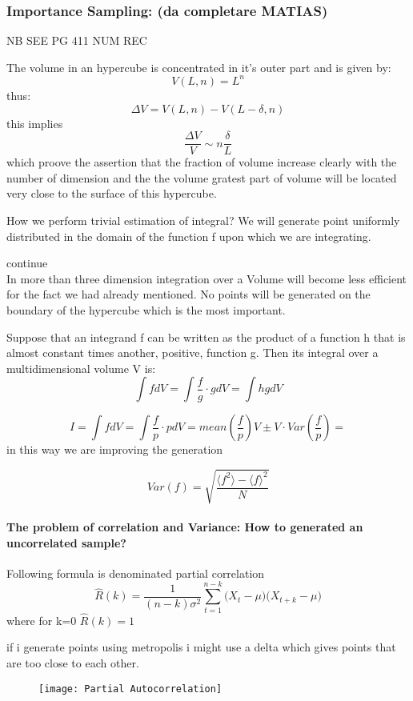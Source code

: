 \begin{figure}[h]
\centering
{}
\caption{}
\label{fig:Rejection method1}
\end{figure}

\subsubsection{Importance Sampling: (da completare MATIAS)}
NB SEE PG 411 NUM REC

The volume in an hypercube is concentrated in it's outer part and is given by:
\[ V(L,n)=L^{n}\]
thus:
\[\Delta V = V(L,n) - V(L-\delta,n)\]
this implies
\[ \frac{\Delta V}{V}\sim n\frac{\delta}{L}\]
which proove the assertion that the fraction of volume increase clearly with the number of dimension and the the volume gratest part of volume will be located very close to the surface of this hypercube.

How we perform trivial estimation of integral?
We will generate point uniformly distributed in the domain of the function f upon which we are integrating.

continue\\ 
In more than three dimension integration over a Volume will become less efficient for the fact we had already mentioned. No points will be generated on the boundary of the hypercube which is the most important.

Suppose that an integrand f can be written as the product of a function h that is almost constant times another, positive, function g. Then its integral over a multidimensional volume V is:
\[\int fdV=\int\frac{f}{g}\cdot gdV = \int hgdV\]

\[I=\int f dV= \int \frac{f}{p} \cdot p dV= mean(\frac{f}{p})V \pm V\cdot Var(\frac{f}{p}) = \]
in this way we are improving the generation 

\[Var(f)= \sqrt{\frac{\langle f^2 \rangle- \langle f  \rangle^2}{N}}\]

\paragraph{The problem of correlation and Variance: How to generated an uncorrelated sample?}


Following formula is denominated partial correlation
\[\hat{R}(k)=\frac{1}{(n-k)\sigma^2}\sum^{n-k}_{t=1}\Big(X_{t}-\mu\Big)\Big(X_{t+k}-\mu\Big) \]
where for k=0 $\hat{R}(k)=1$

if i generate points using metropolis i might use a delta which gives points that are too close to each other.

\begin{figure}[h!t]
\centering
\texttt{[image: Partial Autocorrelation]}
\caption{}\label{PartialAutocorrelation}
\end{figure}